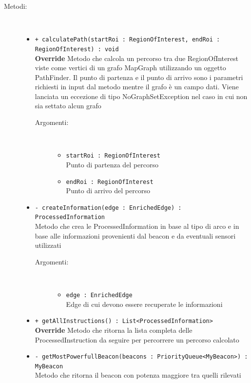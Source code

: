 \documentclass[../DefinizioneDiProdotto.tex]{subfiles}
\begin{document}
\begin{description}
\begin{itemize}
\end{itemize}
\item[Metodi:] \
\begin{itemize}
\item \texttt{+ calculatePath(startRoi : RegionOfInterest, endRoi : RegionOfInterest) : void}\\
\textbf{Override} Metodo che calcola un percorso tra due RegionOfInterest viste come vertici di un grafo MapGraph utilizzando un oggetto PathFinder. Il punto di partenza e il punto di arrivo sono i parametri richiesti in input dal metodo mentre il grafo è un campo dati. Viene lanciata un eccezione di tipo NoGraphSetException nel caso in cui non sia settato alcun grafo
 \begin{description}
\item[Argomenti:] \
\begin{itemize}
\item \texttt{startRoi : RegionOfInterest}\\
Punto di partenza del percorso\item \texttt{endRoi : RegionOfInterest}\\
Punto di arrivo del percorso\end{itemize}
\end{description}
\item \texttt{- createInformation(edge : EnrichedEdge) : ProcessedInformation}\\
Metodo che crea le ProcessedInformation in base al tipo di arco e in base alle informazioni provenienti dal beacon e da eventuali sensori utilizzati
 \begin{description}
\item[Argomenti:] \
\begin{itemize}
\item \texttt{edge : EnrichedEdge}\\
Edge di cui devono essere recuperate le informazioni\end{itemize}
\end{description}
\item \texttt{+ getAllInstructions() : List<ProcessedInformation>}\\
\textbf{Override} Metodo che ritorna la lista completa delle ProcessedInstruction da seguire per percorrere un percorso calcolato
 \item \texttt{- getMostPowerfullBeacon(beacons : PriorityQueue<MyBeacon>) : MyBeacon}\\
Metodo che ritorna il beacon con potenza maggiore tra quelli rilevati
 \begin{description}

\end{description}
\end{itemize}
\end{description}
\end{document}
